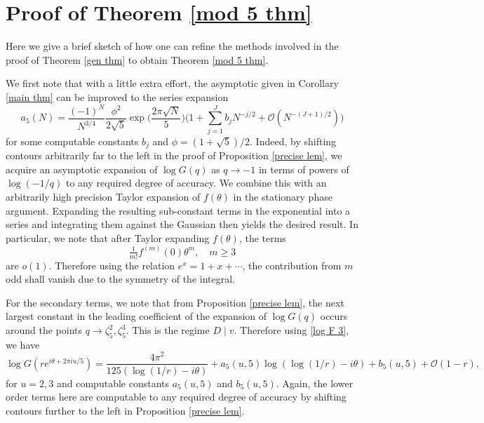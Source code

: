 \documentclass[11pt]{amsart}
\numberwithin{equation}{section}
\theoremstyle{remark}
\begin{document}
\section{Proof of Theorem \ref{mod 5 thm}}\label{Sec: Sketch Proof}
Here we give a brief sketch of how one can refine the methods involved in the proof of Theorem \ref{gen thm} to obtain Theorem \ref{mod 5 thm}.
\par
We first note that with a little extra effort, the asymptotic given in Corollary \ref{main thm} can be improved to the series expansion
\[
a_5(N)
= \frac{(-1)^N}{N^{3/4}}
\frac{\phi^2}{2\sqrt{5}}\exp\Big(\frac{2\pi\sqrt{N}}{5}\Big)
\bigg(1+\sum_{j=1}^Jb_jN^{-j/2}+\mathcal{O}(N^{-(J+1)/2})\bigg)
\]
for some computable constants $b_j$ and $\phi = (1+\sqrt{5})/2$. Indeed, by shifting contours arbitrarily far to the left in the proof of Proposition \ref{precise lem}, we acquire an asymptotic expansion of $\log G(q)$ as $q\to -1$ in terms of powers of $\log(-1/q)$ to any required degree of accuracy. We combine this with an arbitrarily high precision Taylor expansion of $f(\theta)$ in the stationary phase argument. Expanding the resulting sub-constant terms in the exponential into a series and integrating them against the Gaussian then yields the desired result. In particular, we note that after Taylor expanding $f(\theta)$, the terms 
\[
\tfrac{1}{m!} f^{(m)}(0)\theta^m, \quad m \geq 3
\]
are $o(1)$. Therefore using the relation $e^x = 1+x+\cdots$, the contribution from $m$ odd shall vanish due to the symmetry of the integral.

For the secondary terms, we note that from Proposition \ref{precise lem}, the next largest constant in the leading coefficient of the expansion of $\log G(q)$ occurs around the points $q\to \zeta_5^2,\zeta_5^3$. This is the regime $D \mid v$. Therefore using \eqref{log F 3}, we have 
\[
\log G(re^{i\theta+2\pi i u/5})
=
\frac{4\pi^2}{125(\log(1/r)-i\theta)}
+a_5(u,5)\log(\log(1/r)-i\theta)+b_5(u,5)+\mathcal{O}(1-r),
\]
for $u=2,3$ and computable constants $a_5(u,5)$ and $b_5(u,5)$. Again, the lower order terms here are computable to any required degree of accuracy by shifting contours further to the left in Proposition \ref{precise lem}. 
\end{document}
